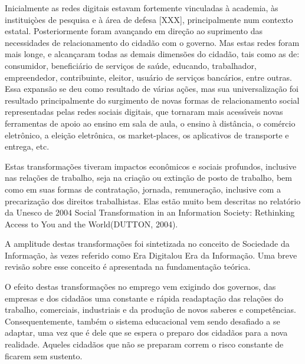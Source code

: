 \documentclass[
12pt,		%
openright,	%
twoside,  %
a4paper,			%
chapter=TITLE,		%
english,			%
french,				%
spanish,			%
brazil				%
]{USPSC-classe/USPSC_RedarTex}
\begin{document}
Inicialmente as redes digitais estavam fortemente vinculadas \`a academia, \`as institui\c{c}òes de pesquisa e \`a \'area de defesa [XXX], principalmente num contexto estatal.  Posteriormente foram avan\c{c}ando em dire\c{c}\~ao ao suprimento das necessidades de relacionamento do cidad\~ao com o governo. Mas estas redes foram mais longe, e alcan\c{c}aram todas as demais dimens\~oes do cidad\~ao, tais como as de: consumidor, benefici\'ario de servi\c{c}os de sa\'ude, educando, trabalhador, empreendedor, contribuinte, eleitor, usu\'ario de servi\c{c}os banc\'arios, entre outras.  Essa expans\~ao se deu como resultado de v\'arias a\c{c}\~oes, mas sua universaliza\c{c}\~ao foi resultado principalmente do surgimento de novas formas de relacionamento social representadas pelas redes sociais digitais, que tornaram mais acess\'{\i}veis novas ferramentas de apoio ao ensino em sala de aula, o ensino \`a dist\^ancia, o com\'ercio eletr\^onico, a elei\c{c}\~ao eletr\^onica, os \textquotedbl market-places\textquotedbl , os aplicativos de transporte e entrega, etc.










Estas transforma\c{c}\~oes tiveram impactos econ\^omicos e sociais profundos, inclusive nas rela\c{c}\~oes de trabalho, seja na cria\c{c}\~ao ou extin\c{c}\~ao de posto de trabalho, bem como em suas formas de contrata\c{c}\~ao, jornada, remunera\c{c}\~ao, inclusive com a precariza\c{c}\~ao dos direitos trabalhistas. Elas est\~ao muito bem descritas  no relat\'orio da Unesco  de 2004 \textquotedbl Social Transformation in an Information Society: Rethinking Access to You and the World\textquotedbl  (DUTTON, 2004).










A amplitude destas transforma\c{c}\~oes foi sintetizada no conceito de \textquotedbl Sociedade da Informa\c{c}\~ao\textquotedbl , \`as vezes referido como \textquotedbl Era Digital\textquotedbl  ou \textquotedbl Era da Informa\c{c}\~ao\textquotedbl . Uma breve revis\~ao sobre esse conceito \'e apresentada na fundamenta\c{c}\~ao te\'orica.










O efeito destas transforma\c{c}\~oes no emprego vem exigindo dos governos, das empresas e dos cidad\~aos uma constante e r\'apida readapta\c{c}\~ao  das rela\c{c}\~oes do trabalho, comerciais, industriais e da produ\c{c}\~ao de novos saberes e compet\^encias. Consequentemente, tamb\'em o sistema educacional vem sendo desafiado a se adaptar, uma vez que \'e dele que se espera o preparo dos cidad\~aos para a nova realidade. Aqueles cidad\~aos que n\~ao se preparam correm o risco constante de ficarem sem sustento.
\end{document}
